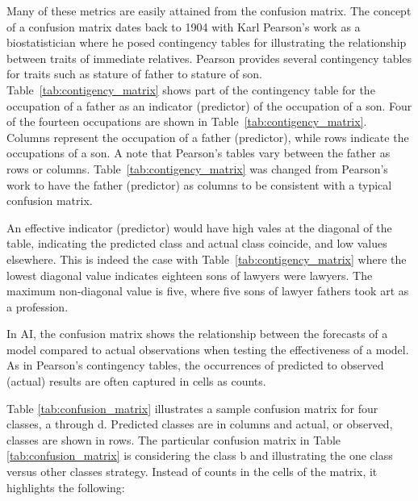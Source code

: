 
Many of these metrics are easily attained from the confusion matrix.  The
concept of a confusion matrix dates back to 1904 with Karl Pearson's work as a
biostatistician where he posed contingency tables for illustrating the
relationship between traits of immediate relatives.  Pearson provides several
contingency tables for traits such as stature of father to stature of son.
Table~\ref{tab:contigency_matrix} shows part of the contingency table for the
occupation of a father as an indicator (predictor) of the occupation of a son.
Four of the fourteen occupations are shown in Table~\ref{tab:contigency_matrix}.
Columns represent the occupation of a father (predictor), while rows indicate
the occupations of a son.  A note that Pearson's tables vary between the father
as rows or columns. Table~\ref{tab:contigency_matrix} was changed from Pearson's
work to have the father (predictor) as columns to be consistent with a typical
confusion matrix\cite{pearson1904theory}.

An effective indicator (predictor) would have high vales at the diagonal of the
table, indicating the predicted class and actual class coincide, and low values
elsewhere.  This is indeed the case with Table~\ref{tab:contigency_matrix} where
the lowest diagonal value indicates eighteen sons of lawyers were lawyers.  The
maximum non-diagonal value is five, where five sons of lawyer fathers took art
as a profession\cite{pearson1904theory}.
 
In AI, the confusion matrix shows the relationship between the forecasts of a
model compared to actual observations when testing the effectiveness of a model.
As in Pearson's contingency tables, the occurrences of predicted to observed
(actual) results are often captured in cells as counts\cite{kruger2016activity,
luque2019impact, gortler2022neo}.

Table \ref{tab:confusion_matrix} illustrates a sample confusion matrix for four
classes, a through d. Predicted classes are in columns and actual, or observed,
classes are shown in rows. The particular confusion matrix in Table
\ref{tab:confusion_matrix} is considering the class b and illustrating the one
class versus other classes strategy.  Instead of counts in the cells of the
matrix, it highlights the following:

